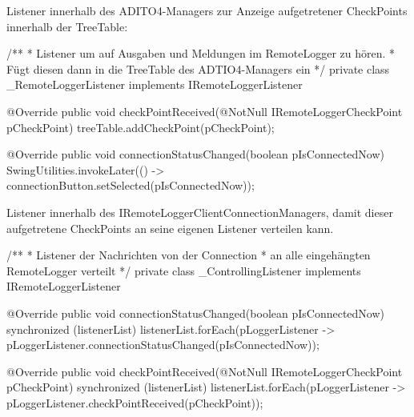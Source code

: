 Listener innerhalb des ADITO4-Managers zur Anzeige aufgetretener CheckPoints innerhalb der TreeTable:
\begin{spacing}{0.75}
	\begin{javacode}
/**
 * Listener um auf Ausgaben und Meldungen im RemoteLogger zu hören.
 * Fügt diesen dann in die TreeTable des ADTIO4-Managers ein
 */
private class _RemoteLoggerListener implements IRemoteLoggerListener
{
  @Override
  public void checkPointReceived(@NotNull IRemoteLoggerCheckPoint pCheckPoint)
  {
    treeTable.addCheckPoint(pCheckPoint);
  }

  @Override
  public void connectionStatusChanged(boolean pIsConnectedNow)
  {
    SwingUtilities.invokeLater(() -> connectionButton.setSelected(pIsConnectedNow));
  }
}	\end{javacode}
\end{spacing}

\vspace{10px}

Listener innerhalb des IRemoteLoggerClientConnectionManagers, damit dieser aufgetretene CheckPoints an seine eigenen Listener verteilen kann.
\begin{spacing}{0.75}
	\begin{javacode}
/**
 * Listener der Nachrichten von der Connection
 * an alle eingehängten RemoteLogger verteilt
 */
private class _ControllingListener implements IRemoteLoggerListener
{
  @Override
  public void connectionStatusChanged(boolean pIsConnectedNow)
  {
    synchronized (listenerList)
    {
      listenerList.forEach(pLoggerListener -> 
        pLoggerListener.connectionStatusChanged(pIsConnectedNow));
    }
  }
  
  @Override
  public void checkPointReceived(@NotNull IRemoteLoggerCheckPoint pCheckPoint)
  {
    synchronized (listenerList)
    {
      listenerList.forEach(pLoggerListener -> 
        pLoggerListener.checkPointReceived(pCheckPoint));
    }
  }
}\end{javacode}
\end{spacing}

\vspace{10px}

